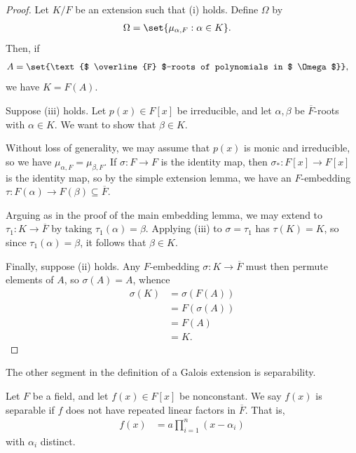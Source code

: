 \documentclass[10pt]{mypackage}
\begin{document}
\begin{proof}
  Let $K/F$ be an extension such that (i) holds. Define $\Omega$ by
  \begin{align*}
    \Omega &= \set{\mu_{\alpha,F} : \alpha\in K}.
  \end{align*}
  Then, if
  \begin{align*}
    A &= \set{\text{$ \overline{F} $-roots of polynomials in $ \Omega $}},
  \end{align*}
  we have $K = F(A)$.

  Suppose (iii) holds. Let $p(x)\in F[x]$ be irreducible, and let $\alpha,\beta$ be $ \overline{F} $-roots with $\alpha\in K$. We want to show that $\beta\in K$.

  Without loss of generality, we may assume that $p(x)$ is monic and irreducible, so we have $\mu_{\alpha,F} = \mu_{\beta,F}$. If $\sigma\colon F\rightarrow F$ is the identity map, then $\sigma_{\ast}\colon F[x]\rightarrow F[x]$ is the identity map, so by the simple extension lemma, we have an $F$-embedding $\tau\colon F(\alpha)\rightarrow F(\beta)\subseteq \overline{F}$.

  Arguing as in the proof of the main embedding lemma, we may extend to $\tau_1\colon K\rightarrow \overline{F}$ by taking $\tau_1\left( \alpha \right) = \beta$. Applying (iii) to $\sigma = \tau_1$ has $\tau(K) = K$, so since $\tau_1\left( \alpha \right) = \beta$, it follows that $\beta\in K$.

  Finally, suppose (ii) holds. Any $F$-embedding $\sigma\colon K\rightarrow \overline{F}$ must then permute elements of $A$, so $\sigma(A) = A$, whence
  \begin{align*}
    \sigma(K) &= \sigma\left( F(A) \right)\\
              &= F\left( \sigma(A) \right)\\
              &= F\left( A \right)\\
              &= K.
  \end{align*}
\end{proof}
The other segment in the definition of a Galois extension is separability.
\begin{definition}
  Let $F$ be a field, and let $f(x)\in F[x]$ be nonconstant. We say $f(x)$ is separable if $f$ does not have repeated linear factors in $ \overline{F} $. That is,
  \begin{align*}
    f(x) &= a\prod_{i=1}^{n} \left( x-\alpha_i \right)
  \end{align*}
  with $\alpha_i$ distinct.
\end{definition}
\end{document}
